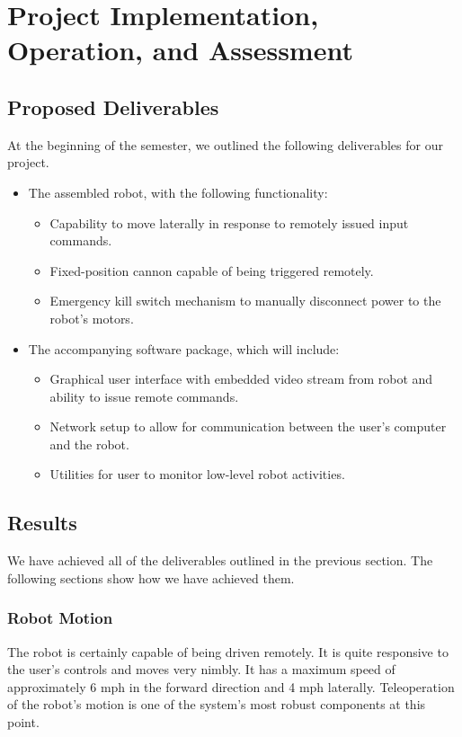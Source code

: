 \documentclass[letterpaper,12pt]{article}
\begin{document}
\section{Project Implementation, Operation, and Assessment}
\label{sec:implopassess}

\subsection{Proposed Deliverables}
At the beginning of the semester, we outlined the following deliverables for our
project.

\begin{itemize}
\item The assembled robot, with the following functionality:
  \begin{itemize}
  \item Capability to move laterally in response to remotely issued input commands.
  \item Fixed-position cannon capable of being triggered remotely.
  \item Emergency kill switch mechanism to manually disconnect power to the
    robot's motors.
  \end{itemize}
\item The accompanying software package, which will include:
  \begin{itemize}
  \item Graphical user interface with embedded video stream from robot and
    ability to issue remote commands.
  \item Network setup to allow for communication between the user's computer and
    the robot.
  \item Utilities for user to monitor low-level robot activities.
  \end{itemize}
\end{itemize}

\subsection{Results}
We have achieved all of the deliverables outlined in the previous section. The
following sections show how we have achieved them.

\subsubsection{Robot Motion}
The robot is certainly capable of being driven remotely. It is quite responsive
to the user's controls and moves very nimbly. It has a maximum speed of
approximately 6 mph in the forward direction and 4 mph laterally. Teleoperation
of the robot's motion is one of the system's most robust components at this
point.
\end{document}
